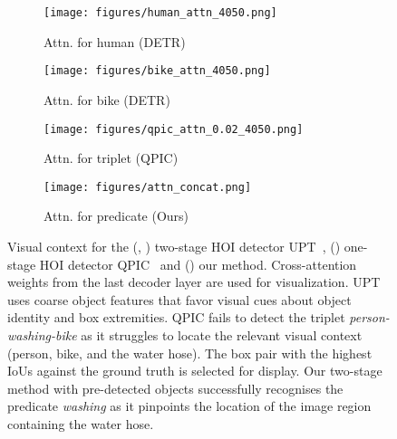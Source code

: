 \documentclass[10pt,twocolumn,letterpaper]{article}
\begin{document}
\begin{figure}[t]
   \begin{subfigure}[t]{0.49\linewidth}
      \centering
      \texttt{[image: figures/human\_attn\_4050.png]}
      \caption{Attn. for human (DETR)}
      \label{fig:teaser-hum-attn}
   \end{subfigure}\hfill \begin{subfigure}[t]{0.49\linewidth}
      \centering
      \texttt{[image: figures/bike\_attn\_4050.png]}
      \caption{Attn. for bike (DETR)}
      \label{fig:teaser-bike-attn}
   \end{subfigure}\vfill \begin{subfigure}[t]{0.49\linewidth}
      \centering
      \texttt{[image: figures/qpic\_attn\_0.02\_4050.png]}
      \caption{Attn. for triplet (QPIC)}
      \label{fig:teaser-qpic-attn}
   \end{subfigure}\hfill \begin{subfigure}[t]{0.49\linewidth}
      \centering
      \texttt{[image: figures/attn\_concat.png]}
      \caption{Attn. for predicate (Ours)}
      \label{fig:teaser-ours-attn}
   \end{subfigure}\vspace{10px}
   \caption{Visual context for the (, ) two-stage HOI detector UPT~\cite{upt}, () one-stage HOI detector QPIC~\cite{qpic} and () our method. Cross-attention weights from the last decoder layer are used for visualization. UPT uses coarse object features that favor visual cues about object identity and box extremities. QPIC fails to detect the triplet \textit{person-washing-bike} as it struggles to locate the relevant visual context (person, bike, and the water hose). The box pair with the highest IoUs against the ground truth is selected for display. Our two-stage method with pre-detected objects successfully recognises the predicate \textit{washing} as it pinpoints the location of the image region containing the water hose.}
   \label{fig:teaser}
\end{figure}
\end{document}
